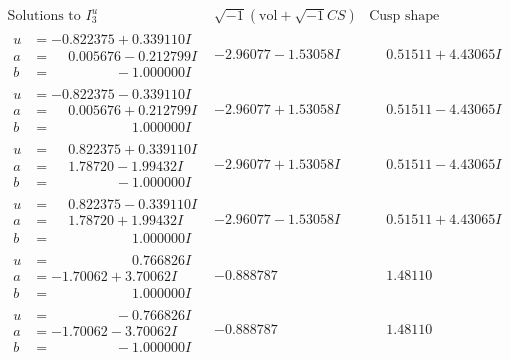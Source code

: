 \documentclass[1p]{elsarticle_modified}
\theoremstyle{definition}
\newcommand{\I}{\sqrt{-1}}
\begin{document}
$$\begin{array}{c|c|c}  
\text{Solutions to }I^u_{3}& \I (\text{vol} + \sqrt{-1}CS) & \text{Cusp shape}\\
 \hline 
\begin{aligned}
u &= -0.822375 + 0.339110 I \\
a &= \phantom{-}0.005676 - 0.212799 I \\
b &= \phantom{-0.000000 } -1.000000 I\end{aligned}
 & -2.96077 - 1.53058 I & \phantom{-}0.51511 + 4.43065 I \\ \hline\begin{aligned}
u &= -0.822375 - 0.339110 I \\
a &= \phantom{-}0.005676 + 0.212799 I \\
b &= \phantom{-0.000000 -}1.000000 I\end{aligned}
 & -2.96077 + 1.53058 I & \phantom{-}0.51511 - 4.43065 I \\ \hline\begin{aligned}
u &= \phantom{-}0.822375 + 0.339110 I \\
a &= \phantom{-}1.78720 - 1.99432 I \\
b &= \phantom{-0.000000 } -1.000000 I\end{aligned}
 & -2.96077 + 1.53058 I & \phantom{-}0.51511 - 4.43065 I \\ \hline\begin{aligned}
u &= \phantom{-}0.822375 - 0.339110 I \\
a &= \phantom{-}1.78720 + 1.99432 I \\
b &= \phantom{-0.000000 -}1.000000 I\end{aligned}
 & -2.96077 - 1.53058 I & \phantom{-}0.51511 + 4.43065 I \\ \hline\begin{aligned}
u &= \phantom{-0.000000 -}0.766826 I \\
a &= -1.70062 + 3.70062 I \\
b &= \phantom{-0.000000 -}1.000000 I\end{aligned}
 & -0.888787\phantom{ +0.000000I} & \phantom{-}1.48110\phantom{ +0.000000I} \\ \hline\begin{aligned}
u &= \phantom{-0.000000 } -0.766826 I \\
a &= -1.70062 - 3.70062 I \\
b &= \phantom{-0.000000 } -1.000000 I\end{aligned}
 & -0.888787\phantom{ +0.000000I} & \phantom{-}1.48110\phantom{ +0.000000I} \\ \hline\begin{aligned}

\end{aligned}
\end{array}$$
\end{document}
